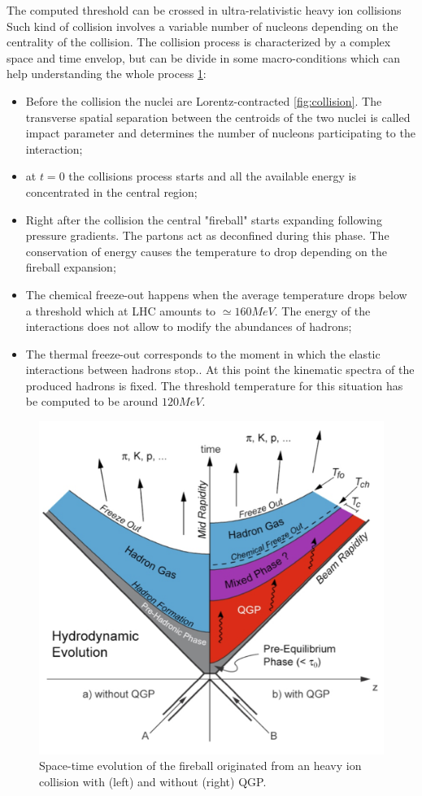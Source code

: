 The computed threshold can be crossed in ultra-relativistic heavy ion collisions
Such kind of collision involves a variable number of nucleons depending on the centrality of the collision.
The collision process is characterized by a complex space and time envelop, but can be divide in some macro-conditions which can help understanding the whole process \ref{fig:evolution}:
\begin{itemize}
    \item Before the collision the nuclei are Lorentz-contracted \ref{fig:collision}. The transverse spatial separation between the centroids of the two nuclei is called impact parameter and determines the number of nucleons participating to the interaction;
    \item at $t=0$ the collisions process starts and all the available energy is concentrated in the central region;
    \item Right after the collision the central "fireball" starts expanding following pressure gradients. The partons act as deconfined during this phase. The conservation of energy causes the temperature to drop depending on the fireball expansion;
    \item The chemical freeze-out happens when the average temperature drops below a threshold which at LHC amounts to $\simeq160 MeV$. The energy of the interactions does not allow to modify the abundances of hadrons;
    \item The thermal freeze-out corresponds to the moment in which the elastic interactions between hadrons stop.. At this point the kinematic spectra of the produced hadrons is fixed. The threshold temperature for this situation has be computed to be around $120 MeV$.
\end{itemize}

\begin{figure}[!t]
\begin{center}
\includegraphics[width=0.85\linewidth]{Chapters/Introduction/Figs/QGP_evo.png}
\caption{Space-time evolution of the fireball originated from an heavy ion collision with (left) and without (right) QGP.}
\label{fig:evolution}
\end{center}
\end{figure}

